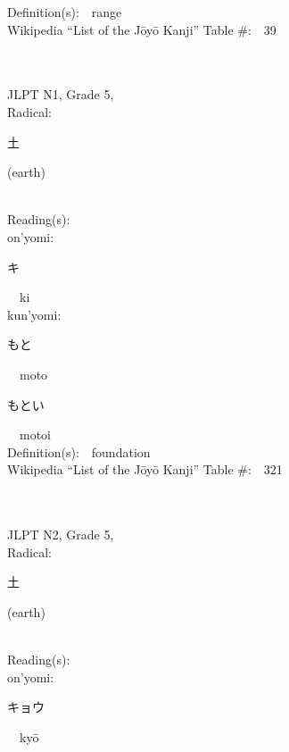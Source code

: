 \begin{multicols}{2}
Definition(s):\ \ range \\
Wikipedia ``List of the J\=oy\=o Kanji'' Table \#:\ \ 39 \\
\ \ \\
{\fontsize{34pt}{40pt}  }\ \ \\  %
{JLPT N1, Grade 5, \\Radical:\ \ {\begin{CJK}{UTF8}{min} 土 \end{CJK}} (earth) } \\
Reading(s):\ \ \\
{\hspace*{1em}}on'yomi:\ \ \\
{\hspace*{2em}}{\begin{CJK}{UTF8}{min} キ \end{CJK}}\ \ ki\ \ \\
{\hspace*{1em}}kun'yomi:\ \ \\
{\hspace*{2em}}{\begin{CJK}{UTF8}{min} もと \end{CJK}}\ \ moto\ \ \\
{\hspace*{2em}}{\begin{CJK}{UTF8}{min} もとい \end{CJK}}\ \ motoi\ \ \\
Definition(s):\ \ foundation \\
Wikipedia ``List of the J\=oy\=o Kanji'' Table \#:\ \ 321 \\
\ \ \\
{\fontsize{34pt}{40pt}  }\ \ \\  %
{JLPT N2, Grade 5, \\Radical:\ \ {\begin{CJK}{UTF8}{min} 土 \end{CJK}} (earth) } \\
Reading(s):\ \ \\
{\hspace*{1em}}on'yomi:\ \ \\
{\hspace*{2em}}{\begin{CJK}{UTF8}{min} キョウ \end{CJK}}\ \ ky\=o\ \ \\

\end{multicols}
